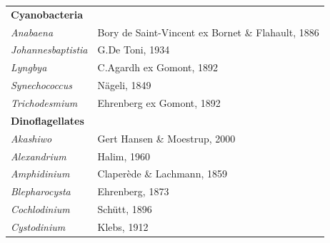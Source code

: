 \documentclass[]{agujournal2019}
\begin{document}
\begin{table}
{\begin{tabular}{@{}ll@{}}
\textbf{Cyanobacteria}     &                                                            \\
\textit{Anabaena}          & Bory de Saint-Vincent ex Bornet \& Flahault, 1886          \\
\textit{Johannesbaptistia} & G.De Toni, 1934                                            \\
\textit{Lyngbya}           & C.Agardh ex Gomont, 1892                                   \\
\textit{Synechococcus}     & Nägeli, 1849                                               \\
\textit{Trichodesmium}     & Ehrenberg ex Gomont, 1892                                  \\
\textbf{Dinoflagellates}    &                                                            \\
\textit{Akashiwo}          & Gert Hansen \& Moestrup, 2000                              \\
\textit{Alexandrium}       & Halim, 1960                                                \\
\textit{Amphidinium}       & Claperède \& Lachmann, 1859                                \\
\textit{Blepharocysta}     & Ehrenberg, 1873                                            \\
\textit{Cochlodinium}      & Schütt, 1896                                               \\
\textit{Cystodinium}       & Klebs, 1912                                                \\


\end{tabular}}
\end{table}
\end{document}
